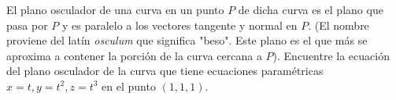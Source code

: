 \item El plano osculador de una curva en un punto $P$ de dicha curva es el plano que pasa por $P$ y es paralelo a los vectores tangente y normal en $P$. (El nombre proviene del latín \textit{osculum} que significa "beso". Este plano es el que más se aproxima a contener la porción de la curva cercana a $P$). Encuentre la ecuación del plano osculador de la curva que tiene ecuaciones paramétricas $x = t, y = t^2, z = t^3$ en el punto $(1, 1, 1)$.
